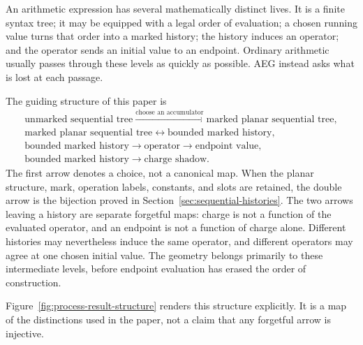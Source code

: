An arithmetic expression has several mathematically distinct lives.  It is a finite
syntax tree; it may be equipped with a legal order of evaluation; a chosen running
value turns that order into a marked history; the history induces an operator; and
the operator sends an initial value to an endpoint.  Ordinary arithmetic usually
passes through these levels as quickly as possible.  AEG instead asks what is lost
at each passage.

The guiding structure of this paper is
\begin{equation}\label{eq:process-result-hierarchy}
\begin{gathered}
\text{unmarked sequential tree}
  \xrightarrow{\text{choose an accumulator}}
\text{marked planar sequential tree},\\
\text{marked planar sequential tree}
  \longleftrightarrow
\text{bounded marked history},\\
\text{bounded marked history}
  \longrightarrow \text{operator}
  \longrightarrow \text{endpoint value},\\
\text{bounded marked history}
  \longrightarrow \text{charge shadow}.
\end{gathered}
\end{equation}
The first arrow denotes a choice, not a canonical map.  When the planar structure,
mark, operation labels, constants, and slots are retained, the double arrow is the
bijection proved in Section~\ref{sec:sequential-histories}.  The two arrows leaving a
history are separate forgetful maps: charge is not a function of the evaluated
operator, and an endpoint is not a function of charge alone.  Different histories
may nevertheless induce the same operator, and different operators may agree at one
chosen initial value.  The geometry belongs primarily to these intermediate
levels, before endpoint evaluation has erased the order of construction.

Figure~\ref{fig:process-result-structure} renders this structure explicitly.
It is a map of the distinctions used in the paper, not a claim that any
forgetful arrow is injective.

